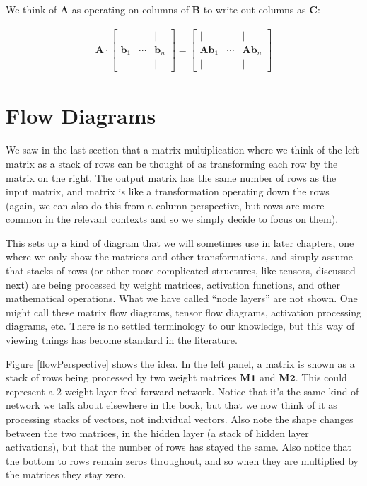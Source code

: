 We think of $\mathbf{A}$ as operating on columns of $\mathbf{B}$ to write out columns as $\mathbf{C}$:

\begin{align*}
\mathbf{A} \cdot
\begin{bmatrix}
\vert &        & \vert \\
\mathbf{b}_1 & \cdots & \mathbf{b}_n \\
\vert &        & \vert
\end{bmatrix}
=
\begin{bmatrix}
\vert &        & \vert \\
\mathbf{A} \mathbf{b}_1 & \cdots & \mathbf{A} \mathbf{b}_n \\
\vert &        & \vert
\end{bmatrix}
\end{align*}


\section{Flow Diagrams}\label{flowDiagrams}

We saw in the last section that a matrix multiplication where we think of the left matrix as a stack of rows can be thought of as transforming each row by the matrix on the right.  The output matrix has the same number of rows as the input matrix, and matrix is like a transformation operating down the rows (again, we can also do this from a column perspective, but rows are more common in the relevant contexts and so we simply decide to focus on them). 

This sets up a kind of diagram that we will sometimes use in later chapters, one where we only show the matrices and other transformations, and simply assume that stacks of rows (or other more complicated structures, like tensors, discussed next) are being processed by weight matrices, activation functions, and other mathematical operations. What we have called ``node layers'' are not shown.  One might call these matrix flow diagrams, tensor flow diagrams, activation processing diagrams, etc. There is no settled terminology to our knowledge, but this way of viewing things has become standard in the literature.

Figure \ref{flowPerspective} shows the idea. In the left panel, a matrix is shown as a stack of rows being processed by two weight matrices $\mathbf{M1}$ and $\mathbf{M2}$. This could represent a 2 weight layer feed-forward network. Notice that it's the same kind of network we talk about elsewhere in the book, but that we now think of it as processing stacks of vectors, not individual vectors. Also note the shape changes between the two matrices, in the hidden layer (a stack of hidden layer activations), but that the number of rows has stayed the same. Also notice that the bottom to rows remain zeros throughout, and so when they are multiplied by the matrices they stay zero. 

